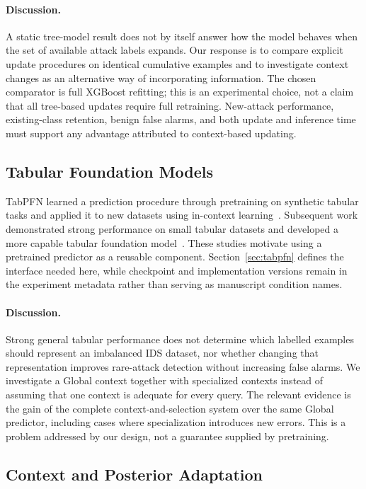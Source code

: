 \documentclass[sigconf,anonymous,pbalance]{acmart}
\begin{document}
\paragraph{Discussion.}
A static tree-model result does not by itself answer how the model behaves when the set of available attack labels expands. Our response is to compare explicit update procedures on identical cumulative examples and to investigate context changes as an alternative way of incorporating information. The chosen comparator is full XGBoost refitting; this is an experimental choice, not a claim that all tree-based updates require full retraining. New-attack performance, existing-class retention, benign false alarms, and both update and inference time must support any advantage attributed to context-based updating.

\subsection{Tabular Foundation Models}
TabPFN learned a prediction procedure through pretraining on synthetic tabular tasks and applied it to new datasets using in-context learning~\cite{hollmann2023tabpfn}. Subsequent work demonstrated strong performance on small tabular datasets and developed a more capable tabular foundation model~\cite{hollmann2025tabpfn}. These studies motivate using a pretrained predictor as a reusable component. Section~\ref{sec:tabpfn} defines the interface needed here, while checkpoint and implementation versions remain in the experiment metadata rather than serving as manuscript condition names.

\paragraph{Discussion.}
Strong general tabular performance does not determine which labelled examples should represent an imbalanced IDS dataset, nor whether changing that representation improves rare-attack detection without increasing false alarms. We investigate a Global context together with specialized contexts instead of assuming that one context is adequate for every query. The relevant evidence is the gain of the complete context-and-selection system over the same Global predictor, including cases where specialization introduces new errors. This is a problem addressed by our design, not a guarantee supplied by pretraining.

\subsection{Context and Posterior Adaptation}
\end{document}
